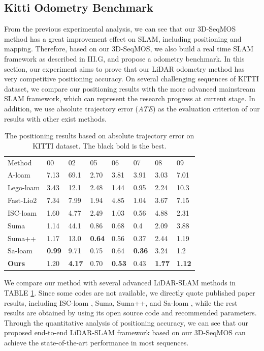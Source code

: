\documentclass[lettersize,journal]{IEEEtran}
\begin{document}
\subsection{Kitti Odometry Benchmark}

From the previous experimental analysis, we can see that our 3D-SeqMOS method has a great improvement effect on SLAM, including positioning and mapping. Therefore, based on our 3D-SeqMOS, we also build a real time SLAM framework as described in III.G, and propose a odometry benchmark. In this section, our experiment aims to prove that our LiDAR odometry method has very competitive positioning accuracy. On several challenging sequences of KITTI dataset, we compare our positioning results with the more advanced mainstream SLAM framework, which can represent the research progress at current stage. In addition, we use absolute trajectory error (\emph{ATE}) as the evaluation criterion of our results with other exist methods.

\begin{table}[h]
\begin{center}
\caption{The positioning results based on absolute trajectory error on KITTI dataset. The black bold is the best.}
\label{table:3}
\begin{tabular}{llllllll}
\hline\noalign{\smallskip}
{\upshape Method} & 00 & 02 & 05 & 06 & 07 & 08 & 09\\
\noalign{\smallskip}
\hline
\noalign{\smallskip}
A-loam & 7.13 &	69.1 & 2.70 & 3.81 & 3.91 &	3.03 & 7.01\\
Lego-loam &	3.43 &	12.1 &	2.48 &	1.44 &	0.95 &	2.24 &	10.3 \\
Fast-Lio2 &	7.34 &	7.99 &	1.94 &	4.85 &	1.04 &	3.67 &	7.15 \\
ISC-loam &	1.60 &	4.77 &	2.49 &	1.03 &	0.56 &	4.88 &	2.31 \\
Suma &	1.14 &	44.1 &	0.86 &	0.68 &	0.4	 & 2.09 & 3.88 \\
Suma++ & 1.17 &	13.0 &	\textbf{0.64} &	0.56 &	0.37 &	2.44 &	1.19 \\
Sa-loam & \textbf{0.99} & 9.71 &	0.75 &	0.64 &	\textbf{0.36} &	3.24 &	1.2 \\
\textbf{Ours} &	1.20 &	\textbf{4.17} &	0.70 &	\textbf{0.53} &	0.43 &	\textbf{1.77} &	\textbf{1.12} \\
\hline
\end{tabular}
\end{center}
\end{table}

We compare our method with several advanced LiDAR-SLAM methods in TABLE \ref{table:3}. Since some codes are not available, we directly quote published paper results, including ISC-loam \cite{wang2020intensity}, Suma, Suma++, and Sa-loam \cite{li2021sa}, while the rest results are obtained by using its open source code and recommended parameters. Through the quantitative analysis of positioning accuracy, we can see that our proposed end-to-end LiDAR-SLAM framework based on our 3D-SeqMOS can achieve the state-of-the-art performance in most sequences.
\end{document}
